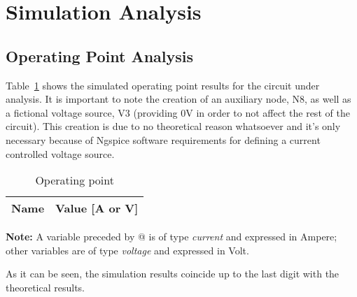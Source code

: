 \section{Simulation Analysis}
\label{sec:simulation}

\subsection{Operating Point Analysis}

Table~\ref{tab:op} shows the simulated operating point results for the circuit
under analysis. It is important to note the creation of an auxiliary node, N8, as well as a fictional voltage source, V3 (providing 0V in order to not affect the rest of the circuit). This creation is due to no theoretical reason whatsoever and it's only necessary because of Ngspice software requirements for defining a current controlled voltage source. 

\begin{table}[h]
  \centering
  \begin{tabular}{|l|r|}
    \hline    
 {\bf Name} & {\bf Value [A or V]} \\ \hline
 
  \end{tabular}
  \caption{Operating point}
  \label{tab:op}
\end{table}

\textbf{Note:}
A variable preceded by @ is of type {\em current}
    and expressed in Ampere; other variables are of type {\it voltage} and expressed in Volt.
    \vspace{0.3cm}
    \par
 As it can be seen, the simulation results coincide up to the last digit with the theoretical results.
 \vspace{6cm}
 \pagebreak




